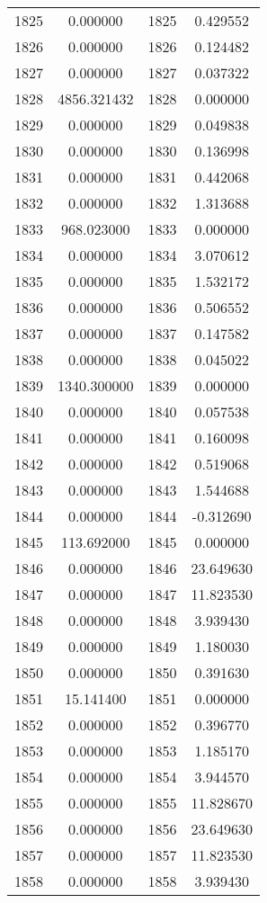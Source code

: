 \documentclass[12pt]{article}
\begin{document}
\begin{longtable}{@{}cccc@{}}
1825 & 0.000000 & 1825 & 0.429552 \\
1826 & 0.000000 & 1826 & 0.124482 \\
1827 & 0.000000 & 1827 & 0.037322 \\
1828 & 4856.321432 & 1828 & 0.000000 \\
1829 & 0.000000 & 1829 & 0.049838 \\
1830 & 0.000000 & 1830 & 0.136998 \\
1831 & 0.000000 & 1831 & 0.442068 \\
1832 & 0.000000 & 1832 & 1.313688 \\
1833 & 968.023000 & 1833 & 0.000000 \\
1834 & 0.000000 & 1834 & 3.070612 \\
1835 & 0.000000 & 1835 & 1.532172 \\
1836 & 0.000000 & 1836 & 0.506552 \\
1837 & 0.000000 & 1837 & 0.147582 \\
1838 & 0.000000 & 1838 & 0.045022 \\
1839 & 1340.300000 & 1839 & 0.000000 \\
1840 & 0.000000 & 1840 & 0.057538 \\
1841 & 0.000000 & 1841 & 0.160098 \\
1842 & 0.000000 & 1842 & 0.519068 \\
1843 & 0.000000 & 1843 & 1.544688 \\
1844 & 0.000000 & 1844 & -0.312690 \\
1845 & 113.692000 & 1845 & 0.000000 \\
1846 & 0.000000 & 1846 & 23.649630 \\
1847 & 0.000000 & 1847 & 11.823530 \\
1848 & 0.000000 & 1848 & 3.939430 \\
1849 & 0.000000 & 1849 & 1.180030 \\
1850 & 0.000000 & 1850 & 0.391630 \\
1851 & 15.141400 & 1851 & 0.000000 \\
1852 & 0.000000 & 1852 & 0.396770 \\
1853 & 0.000000 & 1853 & 1.185170 \\
1854 & 0.000000 & 1854 & 3.944570 \\
1855 & 0.000000 & 1855 & 11.828670 \\
1856 & 0.000000 & 1856 & 23.649630 \\
1857 & 0.000000 & 1857 & 11.823530 \\
1858 & 0.000000 & 1858 & 3.939430 \\

\end{longtable}
\end{document}
